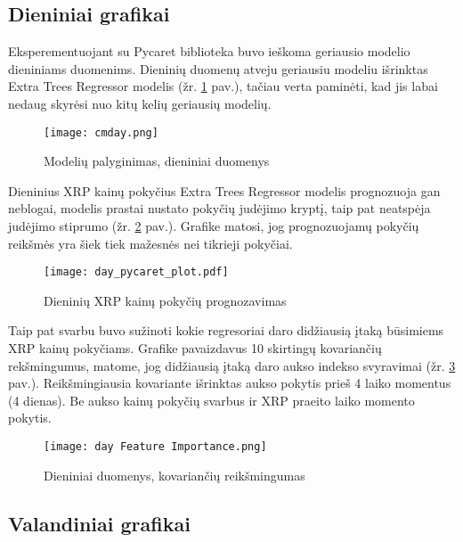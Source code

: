 \documentclass[12pt,a4paper]{article}
\begin{document}
\subsection{Dieniniai grafikai}

Eksperementuojant su Pycaret biblioteka buvo ieškoma geriausio modelio dieniniams duomenims. Dieninių duomenų atveju geriausiu modeliu išrinktas Extra Trees Regressor modelis (žr. \ref{cmday} pav.), tačiau verta paminėti, kad jis labai nedaug skyrėsi nuo kitų kelių geriausių modelių.

\begin{figure}[!h]
\centering
\caption{Modelių palyginimas, dieniniai duomenys}
\label{cmday}
\texttt{[image: cmday.png]}
\end{figure}

Dieninius XRP kainų pokyčius Extra Trees Regressor modelis prognozuoja gan neblogai, modelis prastai nustato pokyčių judėjimo kryptį, taip pat neatspėja judėjimo stiprumo (žr. \ref{daypredpycaret} pav.). Grafike matosi, jog prognozuojamų pokyčių reikšmės yra šiek tiek mažesnės nei tikrieji pokyčiai.

\begin{figure}[!h]
\centering
\caption{Dieninių XRP kainų pokyčių prognozavimas}
\label{daypredpycaret}
\texttt{[image: day\_pycaret\_plot.pdf]}
\end{figure}

Taip pat svarbu buvo sužinoti kokie regresoriai daro didžiausią įtaką būsimiems XRP kainų pokyčiams. Grafike pavaizdavus 10 skirtingų kovariančių rekšmingumus, matome, jog didžiausią įtaką daro aukso indekso svyravimai (žr. \ref{dayfeatimportance} pav.). Reikšmingiausia kovariante išrinktas aukso pokytis prieš 4 laiko momentus (4 dienas). Be aukso kainų pokyčių svarbus ir XRP praeito laiko momento pokytis.

\begin{figure}[!h]
\centering
\caption{Dieniniai duomenys, kovariančių reikšmingumas}
\label{dayfeatimportance}
\texttt{[image: day Feature Importance.png]}
\end{figure}
\newpage
\clearpage

\subsection{Valandiniai grafikai}
\end{document}
